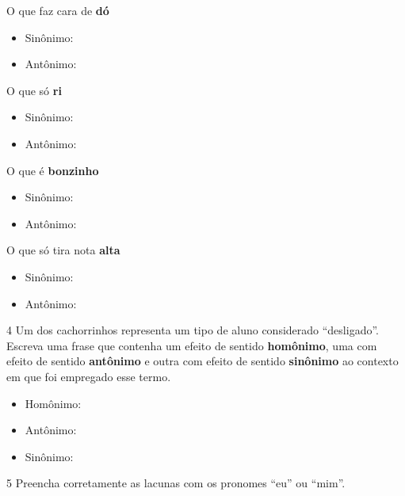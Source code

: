 \begin{escolha}
\item O que faz cara de \textbf{dó}
\begin{itemize}
\item Sinônimo: 
\item Antônimo: 
\end{itemize}

\item O que só \textbf{ri}
\begin{itemize}
\item Sinônimo: 
\item Antônimo: 
\end{itemize}

\item O que é \textbf{bonzinho}
\begin{itemize}
\item Sinônimo: 
\item Antônimo: 
\end{itemize}

\item O que só tira nota \textbf{alta}
\begin{itemize}
\item Sinônimo: 
\item Antônimo: 
\end{itemize}
\end{escolha}

\num{4} Um dos cachorrinhos representa um tipo de aluno considerado
``desligado''. Escreva uma frase que contenha um efeito de sentido
\textbf{homônimo}, uma com efeito de sentido \textbf{antônimo} e outra
com efeito de sentido \textbf{sinônimo} ao contexto em que foi empregado
esse termo.

\begin{itemize}
\item Homônimo: 
\item Antônimo: 
\item Sinônimo: 
\end{itemize}

\num{5} Preencha corretamente as lacunas com os pronomes ``eu'' ou
``mim''.

